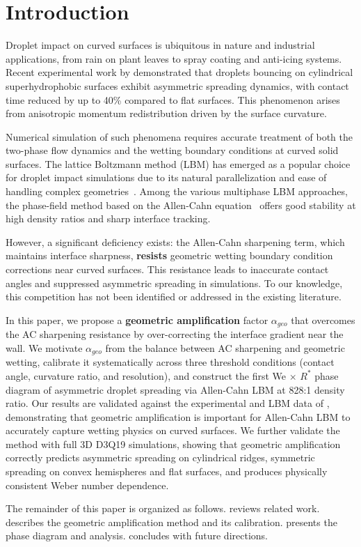 \section{Introduction}\label{sec:intro}

Droplet impact on curved surfaces is ubiquitous in nature and industrial applications, from rain on plant leaves to spray coating and anti-icing systems. Recent experimental work by \citet{liu2015symmetry} demonstrated that droplets bouncing on cylindrical superhydrophobic surfaces exhibit asymmetric spreading dynamics, with contact time reduced by up to 40\% compared to flat surfaces. This phenomenon arises from anisotropic momentum redistribution driven by the surface curvature.

Numerical simulation of such phenomena requires accurate treatment of both the two-phase flow dynamics and the wetting boundary conditions at curved solid surfaces. The lattice Boltzmann method (LBM) has emerged as a popular choice for droplet impact simulations due to its natural parallelization and ease of handling complex geometries~\cite{shan1993lattice, fakhari2017improved}. Among the various multiphase LBM approaches, the phase-field method based on the Allen-Cahn equation~\cite{lee2005lattice} offers good stability at high density ratios and sharp interface tracking.

However, a significant deficiency exists: the Allen-Cahn sharpening term, which maintains interface sharpness, \textbf{resists} geometric wetting boundary condition corrections near curved surfaces. This resistance leads to inaccurate contact angles and suppressed asymmetric spreading in simulations. To our knowledge, this competition has not been identified or addressed in the existing literature.

In this paper, we propose a \textbf{geometric amplification} factor $\alpha_{geo}$ that overcomes the AC sharpening resistance by over-correcting the interface gradient near the wall. We motivate $\alpha_{geo}$ from the balance between AC sharpening and geometric wetting, calibrate it systematically across three threshold conditions (contact angle, curvature ratio, and resolution), and construct the first We $\times$ $R^*$ phase diagram of asymmetric droplet spreading via Allen-Cahn LBM at 828:1 density ratio. Our results are validated against the experimental and LBM data of \citet{liu2015symmetry}, demonstrating that geometric amplification is important for Allen-Cahn LBM to accurately capture wetting physics on curved surfaces. We further validate the method with full 3D D3Q19 simulations, showing that geometric amplification correctly predicts asymmetric spreading on cylindrical ridges, symmetric spreading on convex hemispheres and flat surfaces, and produces physically consistent Weber number dependence.

The remainder of this paper is organized as follows.  reviews related work.  describes the geometric amplification method and its calibration.  presents the phase diagram and analysis.  concludes with future directions.
